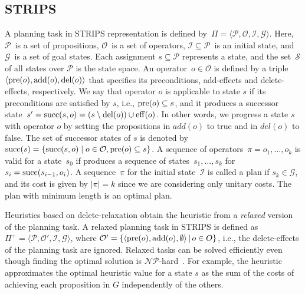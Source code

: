 \documentclass[ppgc,diss,english]{iiufrgs}
\begin{document}
\subsection{STRIPS}
A planning task in STRIPS representation is defined by~$\Pi=\langle\mathcal{P},\mathcal{O},\mathcal{I},\mathcal{G}\rangle$. Here, $\mathcal{P}$~is a set of propositions, $\mathcal{O}$~is a set of operators, $\mathcal{I} \subseteq \mathcal{P}$~is an initial state, and $\mathcal{G}$~is a set of goal states. Each assignment $s \subseteq \mathcal{P}$ represents a state, and the set~$\mathcal{S}$ of all states over $\mathcal{P}$ is the state space.
An operator~$o \in \mathcal{O}$ is defined by a triple~$\langle\operatorname{pre}(o),\operatorname{add}(o),\operatorname{del}(o)\rangle$ that specifies its preconditions, add-effects and delete-effects, respectively. We say that operator $o$ is applicable to state $s$ if its preconditions are satisfied by $s$, i.e., $\operatorname{pre}(o) \subseteq s$, and it produces a successor state~$s' = \operatorname{succ}(s,o) = (s \setminus \operatorname{del}(o)) \cup \operatorname{eff}(o)$. In other words, we progress a state $s$ with operator $o$ by setting the propositions in $add(o)$ to true and in $del(o)$ to false. The set of successor states of $s$ is denoted by~$\operatorname{succ}(s)=\{\operatorname{succ}(s,o)\mid o\in \mathcal{O}, \operatorname{pre}(o) \subseteq s\}$.
A sequence of operators~$\pi=o_1,\ldots,o_k$ is valid for a state~$s_0$ if produces a sequence of states~$s_1,\ldots,s_k$ for $s_i=\operatorname{succ}(s_{i-1},o_i)$. A sequence~$\pi$ for the initial state~$\mathcal{I}$ is called a plan if $s_k \in \mathcal{G}$, and its cost is given by $|\pi| = k$ since we are considering only unitary costs. The plan with minimum length is an optimal plan.

Heuristics based on delete-relaxation obtain the heuristic from a \emph{relaxed} version of the planning task. A relaxed planning task in STRIPS is defined as $\Pi^{+}=\langle\mathcal{P},\mathcal{O'},\mathcal{I},\mathcal{G}\rangle$, where $\mathcal{O'} = \{ \langle \operatorname{pre}(o), \operatorname{add}(o), \emptyset \rangle \,|\, o \in O \}$, i.e., the delete-effects of the planning task are ignored. Relaxed tasks can be solved efficiently even though finding the optimal solution is $\mathcal{NP}$-hard~\cite{Bylander/1994}. For example, the heuristic \hadd approximates the optimal heuristic value for a state $s$ as the sum of the costs of achieving each proposition in $G$ independently of the others.
\end{document}

